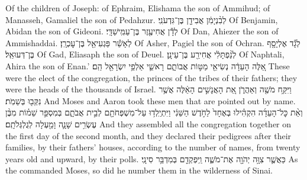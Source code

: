\documentclass[11pt, openany]{book}
\begin{document}
{Of the children of Joseph: of Ephraim, Elishama the son of Ammihud; of Manasseh, Gamaliel the son of Pedahzur.}
{לְבִ֨נְיָמִ֔ן אֲבִידָ֖ן בֶּן־גִּדְעֹנִֽי׃}
{Of Benjamin, Abidan the son of Gideoni.}
{לְדָ֕ן אֲחִיעֶ֖זֶר בֶּן־עַמִּֽישַׁדָּֽי׃}
{Of Dan, Ahiezer the son of Ammishaddai.}
{לְאָשֵׁ֕ר פַּגְעִיאֵ֖ל בֶּן־עׇכְרָֽן׃}
{Of Asher, Pagiel the son of Ochran.}
{לְגָ֕ד אֶלְיָסָ֖ף בֶּן־דְּעוּאֵֽל׃}
{Of Gad, Eliasaph the son of Deuel.}
{לְנַ֨פְתָּלִ֔י אֲחִירַ֖ע בֶּן־עֵינָֽן׃}
{Of Naphtali, Ahira the son of Enan.’}
{אֵ֚לֶּה  הָעֵדָ֔ה נְשִׂיאֵ֖י מַטּ֣וֹת אֲבוֹתָ֑ם רָאשֵׁ֛י אַלְפֵ֥י יִשְׂרָאֵ֖ל הֵֽם׃}
{These were the elect of the congregation, the princes of the tribes of their fathers; they were the heads of the thousands of Israel.}
{וַיִּקַּ֥ח מֹשֶׁ֖ה וְאַהֲרֹ֑ן אֵ֚ת הָאֲנָשִׁ֣ים הָאֵ֔לֶּה אֲשֶׁ֥ר נִקְּב֖וּ בְּשֵׁמֹֽת׃}
{And Moses and Aaron took these men that are pointed out by name.}
{וְאֵ֨ת כׇּל־הָעֵדָ֜ה הִקְהִ֗ילוּ בְּאֶחָד֙ לַחֹ֣דֶשׁ הַשֵּׁנִ֔י וַיִּתְיַֽלְד֥וּ עַל־מִשְׁפְּחֹתָ֖ם לְבֵ֣ית אֲבֹתָ֑ם בְּמִסְפַּ֣ר שֵׁמ֗וֹת מִבֶּ֨ן עֶשְׂרִ֥ים שָׁנָ֛ה וָמַ֖עְלָה לְגֻלְגְּלֹתָֽם׃}
{And they assembled all the congregation together on the first day of the second month, and they declared their pedigrees after their families, by their fathers’ houses, according to the number of names, from twenty years old and upward, by their polls.}
{כַּאֲשֶׁ֛ר צִוָּ֥ה יְהֹוָ֖ה אֶת־מֹשֶׁ֑ה וַֽיִּפְקְדֵ֖ם בְּמִדְבַּ֥ר סִינָֽי׃ \setuma }
{As the \lord\space commanded Moses, so did he number them in the wilderness of Sinai.}
\clearpage
\fancyhead[C]{\haftarahname}


\vspace{12pt}
\end{document}
